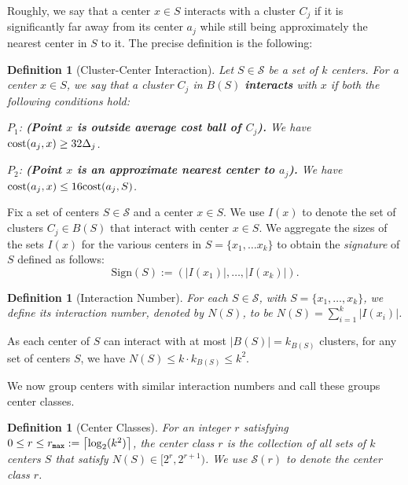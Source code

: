 \documentclass[11pt]{article}
\newtheorem{definition}[lemma]{Definition}
\theoremstyle{restate}
\theoremstyle{definition}
\newcommand{\ceil}[1]{{\left\lceil{#1}\right\rceil}}
\newcommand{\cost}{\textnormal{cost}}
\newcommand{\rmax}{r_\ensuremath{\textnormal{\texttt{max}}}}
\newcommand{\sign}{\text{Sign}}
\begin{document}
Roughly, we say that a center $x \in S$ interacts with a cluster $C_j$ if it is significantly far away from its center $a_j$ while still being approximately the nearest center in $S$ to it. The precise definition is the following: 

\begin{definition}[Cluster-Center Interaction] \label{def: interaction} Let $S \in \mathcal{S}$ be a set of $k$ centers. For a center $x \in S$, we say that a cluster $C_j$ in $B(S)$ \textbf{\emph{interacts}} with $x$ if both the following conditions hold:

\begin{description}
	\item{\textbf{$P_1$}: \textbf{(Point $x$ is outside average cost ball of $C_j$).}} We have  $\cost(a_j,x) \geq 32 \Delta_j$.
	\item{\textbf{$P_2$}: \textbf{(Point $x$ is an approximate nearest center to $a_j$).}} We have $\cost(a_j,x) \leq 16 \cost(a_j,S)$.
\end{description}
\end{definition}



Fix a set of centers $S \in \mathcal{S}$ and a center $x \in S$. We use $I(x)$ to denote the set of clusters $C_j \in B(S)$ that interact with center $x \in S$. We aggregate the sizes of the sets $I(x)$ for the various centers in $S = \{x_1, \ldots x_k\}$ to obtain the \textit{signature} of $S$ defined as follows: \[\sign(S) := (|I(x_1)|, \ldots, |I(x_k)|).\]

\begin{definition}[Interaction Number]\label{def: interaction-number}
For each $S \in \mathcal{S}$, with $S = \{x_1, \ldots, x_k \}$,  we define its interaction number, denoted by $N(S)$, to be $N(S) = \sum_{i = 1}^k |I(x_i)|$.
\end{definition}
 As each center of $S$ can interact with at most $|B(S)| = k_{B(S)}$ clusters, 
for any set of centers $S$, we have  $N(S) \leq k \cdot k_{B(S)}\leq k^2$.


\noindent We now group centers with similar interaction numbers and call these groups center classes.
\begin{definition}[Center Classes]
For an integer $r$ satisfying $0 \leq r \leq \rmax:= \ceil{\log_2(k^2)}$, the center class $r$ is the collection of all sets of $k$ centers $S$ that satisfy $N(S) \in [2^r, 2^{r+1})$. We use  $\mathcal{S}(r)$ to denote the center class $r$.
\end{definition}
\end{document}

